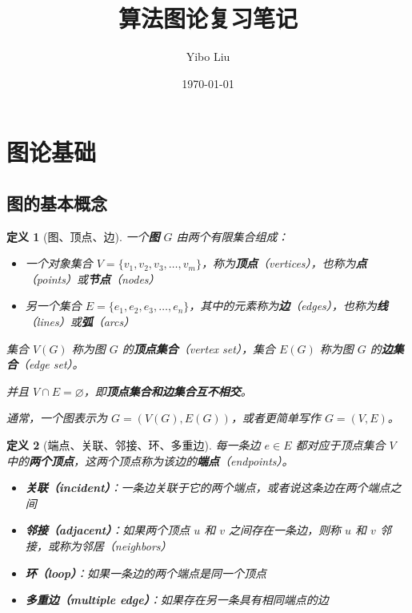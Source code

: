 \documentclass[12pt, a4paper]{article}
\title{算法图论复习笔记}
\author{Yibo Liu}
\date{\today}
\newtheorem{definition}{定义}[section]
\begin{document}
\maketitle

\tableofcontents
\newpage


\section{图论基础}

\subsection{图的基本概念}

\begin{definition}[图、顶点、边]
一个\textbf{图} $G$ 由两个有限集合组成：
\begin{itemize}
    \item 一个对象集合 $V = \{v_1, v_2, v_3, \dots, v_m\}$，称为\textbf{顶点}（vertices），也称为\textbf{点}（points）或\textbf{节点}（nodes）
    \item 另一个集合 $E = \{e_1, e_2, e_3, \dots, e_n\}$，其中的元素称为\textbf{边}（edges），也称为\textbf{线}（lines）或\textbf{弧}（arcs）
\end{itemize}

集合 $V(G)$ 称为图 $G$ 的\textbf{顶点集合}（vertex set），集合 $E(G)$ 称为图 $G$ 的\textbf{边集合}（edge set）。

并且 $V \cap E = \varnothing$，即\textbf{顶点集合和边集合互不相交}。

通常，一个图表示为 $G = (V(G), E(G))$，或者更简单写作 $G = (V, E)$。
\end{definition}

\begin{definition}[端点、关联、邻接、环、多重边]
每一条边 $e \in E$ 都对应于顶点集合 $V$ 中的\textbf{两个顶点}，这两个顶点称为该边的\textbf{端点}（endpoints）。

\begin{itemize}
    \item \textbf{关联（incident）}：一条边关联于它的两个端点，或者说这条边在两个端点之间
    \item \textbf{邻接（adjacent）}：如果两个顶点 $u$ 和 $v$ 之间存在一条边，则称 $u$ 和 $v$ 邻接，或称为邻居（neighbors）
    \item \textbf{环（loop）}：如果一条边的两个端点是同一个顶点
    \item \textbf{多重边（multiple edge）}：如果存在另一条具有相同端点的边
\end{itemize}
\end{definition}
\end{document}
